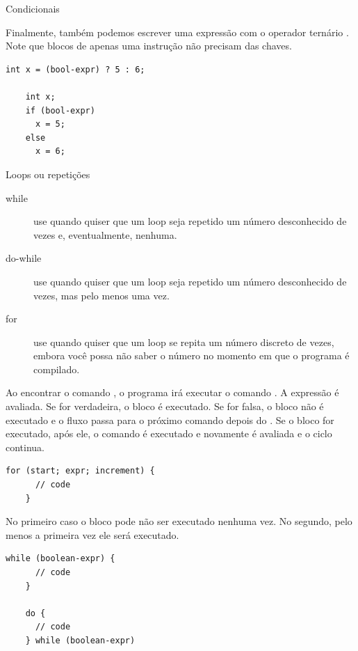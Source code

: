 \documentclass{beamer}
\begin{document}
\begin{frame}{Condicionais}
  \framebreak

  Finalmente, também podemos escrever uma expressão com o operador
  ternário . Note que blocos de apenas uma instrução não
  precisam das chaves.\vspace{.5cm}

  \begin{lstlisting}[style=normalc]
    int x = (bool-expr) ? 5 : 6;

    int x;
    if (bool-expr) 
      x = 5;
    else
      x = 6;
  \end{lstlisting}
\end{frame}

\begin{frame}{Loops ou repetições}

  \begin{description}
  \item[while] use quando quiser que um loop seja repetido um número
    desconhecido de vezes e, eventualmente, nenhuma.
  \item[do-while] use quando quiser que um loop seja repetido um
    número desconhecido de vezes, mas pelo menos uma vez.
  \item[for] use quando quiser que um loop se repita um número
    discreto de vezes, embora você possa não saber o número no momento
    em que o programa é compilado.
  \end{description}

  \framebreak

  Ao encontrar o comando , o programa irá executar o
  comando . A expressão  é avaliada. Se for
  verdadeira, o bloco é executado. Se for falsa, o bloco não é
  executado e o fluxo passa para o próximo comando depois do
  . Se o bloco for executado, após ele, o comando
   é executado e novamente  é avaliada
  e o ciclo continua.\vspace{.5cm}

  \begin{lstlisting}[style=normalc]
    for (start; expr; increment) {
      // code
    }
  \end{lstlisting}

  \framebreak

  No primeiro caso o bloco pode não ser executado nenhuma vez. No
  segundo, pelo menos a primeira vez ele será executado.\vspace{.5cm}

  \begin{lstlisting}[style=normalc]
    while (boolean-expr) {
      // code
    }

    do {
      // code
    } while (boolean-expr)
  \end{lstlisting}

\end{frame}
\end{document}
